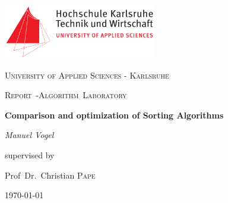 \documentclass[11pt]{amsart}
\begin{document}
\begin{titlepage}
	\centering
	\includegraphics[width=0.5\textwidth]{hska-logo}\par\vspace{1cm}
	{\scshape\LARGE University of Applied Sciences - Karlsruhe \par}
	\vspace{1cm}
	{\scshape\Large Report~-Algorithm~Laboratory\par}
	\vspace{1.5cm}
	{\huge\bfseries Comparison and optimization of Sorting Algorithms\par}
	\vspace{2cm}
	{\Large\itshape Manuel Vogel\par}
	\vfill
	supervised by\par
	Prof~Dr.~Christian \textsc{Pape}
	\vfill
	{\large \today\par}
\end{titlepage}
\end{document}
